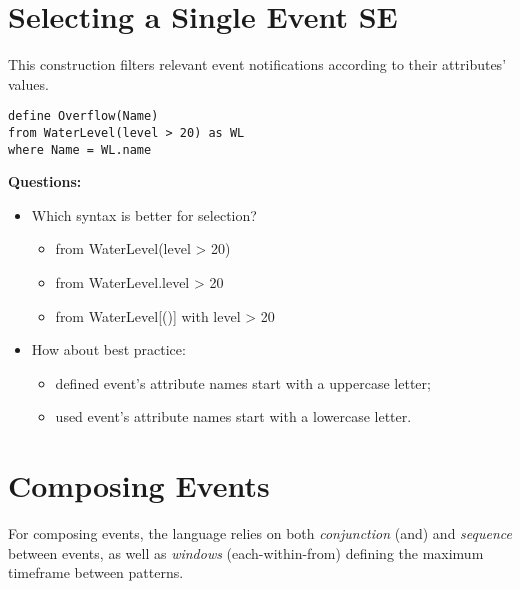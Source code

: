\section{Selecting a Single Event SE}
\label{sec:SelectingASingleEventSE}

This construction filters relevant event notifications according to their attributes' values.

\begin{lstlisting}[language=iotdsl]
define Overflow(Name)
from WaterLevel(level > 20) as WL
where Name = WL.name
\end{lstlisting}

\medskip
\noindent
\textbf{Questions:}
\begin{itemize}
	\item Which syntax is better for selection?
	\begin{itemize}
		\item from WaterLevel(level > 20)
		\item from WaterLevel.level > 20
		\item from WaterLevel[()] with level > 20
	\end{itemize}
	\item How about best practice: 
	\begin{itemize}
		\item defined event's attribute names start with a uppercase letter;
		\item used event's attribute names start with a lowercase letter.
	\end{itemize}
\end{itemize}

\section{Composing Events}
\label{sec:ComposingEvents}

For composing events, the language relies on both \emph{conjunction} (\textsf{and}) and \emph{sequence} between events, as well as \emph{windows} (\textsf{each-within-from}) defining the maximum timeframe between patterns.

